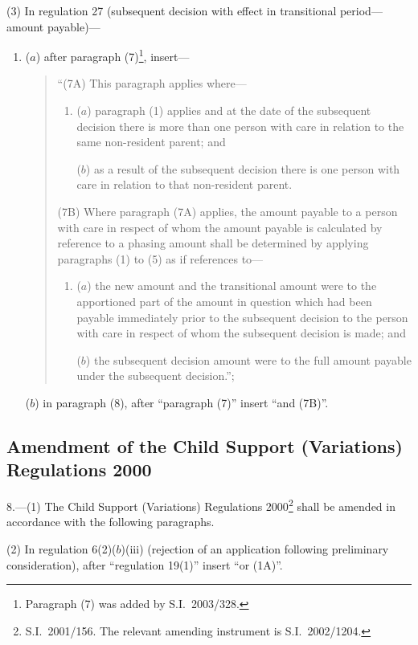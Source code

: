 \documentclass[12pt,a4paper]{article}
\begin{document}
(3) In regulation 27 (subsequent decision with effect in transitional period---amount payable)—
\begin{enumerate}\item[]
($a$) after paragraph (7)\footnote{Paragraph (7) was added by S.I.\ 2003/328.}, insert—
\begin{quotation}
“(7A) This paragraph applies where—
\begin{enumerate}\item[]
($a$) paragraph (1) applies and at the date of the subsequent decision there is more than one person with care in relation to the same non-resident parent; and

($b$) as a result of the subsequent decision there is one person with care in relation to that non-resident parent.
\end{enumerate}

(7B) Where paragraph (7A) applies, the amount payable to a person with care in respect of whom the amount payable is calculated by reference to a phasing amount shall be determined by applying paragraphs (1) to (5) as if references to—
\begin{enumerate}\item[]
($a$) the new amount and the transitional amount were to the apportioned part of the amount in question which had been payable immediately prior to the subsequent decision to the person with care in respect of whom the subsequent decision is made; and

($b$) the subsequent decision amount were to the full amount payable under the subsequent decision.”;
\end{enumerate}
\end{quotation}

($b$) in paragraph (8), after “paragraph (7)” insert “and (7B)”.
\end{enumerate}

\subsection[8. Amendment of the Child Support (Variations) Regulations 2000]{Amendment of the Child Support (Variations) Regulations 2000}

8.---(1)  The Child Support (Variations) Regulations 2000\footnote{S.I.\ 2001/156. The relevant amending instrument is S.I.\ 2002/1204.} shall be amended in accordance with the following paragraphs.

(2) In regulation 6(2)($b$)(iii) (rejection of an application following preliminary consideration), after “regulation 19(1)” insert “or (1A)”.
\end{document}
